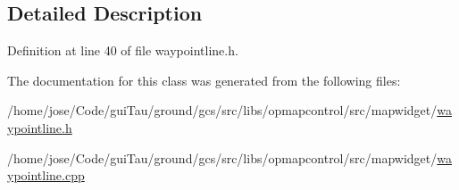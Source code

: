 \subsection{Detailed Description}


Definition at line 40 of file waypointline.\-h.



The documentation for this class was generated from the following files\-:\begin{DoxyCompactItemize}
\item 
/home/jose/\-Code/gui\-Tau/ground/gcs/src/libs/opmapcontrol/src/mapwidget/\hyperlink{waypointline_8h}{waypointline.\-h}\item 
/home/jose/\-Code/gui\-Tau/ground/gcs/src/libs/opmapcontrol/src/mapwidget/\hyperlink{waypointline_8cpp}{waypointline.\-cpp}\end{DoxyCompactItemize}

